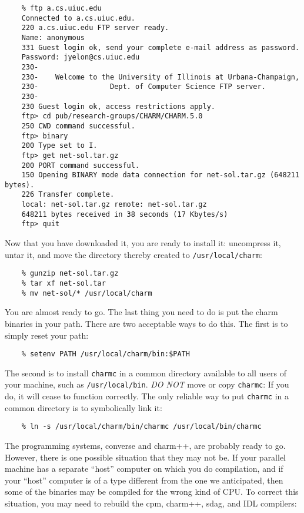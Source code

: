\begin{verbatim}
    % ftp a.cs.uiuc.edu
    Connected to a.cs.uiuc.edu.
    220 a.cs.uiuc.edu FTP server ready.
    Name: anonymous
    331 Guest login ok, send your complete e-mail address as password.
    Password: jyelon@cs.uiuc.edu
    230-
    230-    Welcome to the University of Illinois at Urbana-Champaign,
    230-                 Dept. of Computer Science FTP server.
    230-
    230 Guest login ok, access restrictions apply.
    ftp> cd pub/research-groups/CHARM/CHARM.5.0
    250 CWD command successful.
    ftp> binary
    200 Type set to I.
    ftp> get net-sol.tar.gz
    200 PORT command successful.
    150 Opening BINARY mode data connection for net-sol.tar.gz (648211 bytes).
    226 Transfer complete.
    local: net-sol.tar.gz remote: net-sol.tar.gz
    648211 bytes received in 38 seconds (17 Kbytes/s)
    ftp> quit
\end{verbatim}

Now that you have downloaded it, you are ready to install it: uncompress it,
untar it, and move the directory thereby created to {\tt /usr/local/charm}:

\begin{verbatim}
    % gunzip net-sol.tar.gz
    % tar xf net-sol.tar
    % mv net-sol/* /usr/local/charm
\end{verbatim}

You are almost ready to go.  The last thing you need to do is put the
charm binaries in your path.  There are two acceptable ways to do
this.  The first is to simply reset your path:

\begin{verbatim}
    % setenv PATH /usr/local/charm/bin:$PATH
\end{verbatim}

The second is to install {\tt charmc} in a common directory available
to all users of your machine, such as {\tt /usr/local/bin}.  {\em DO
NOT} move or copy {\tt charmc}: If you do, it will cease to function correctly.
The only reliable way to
put {\tt charmc} in a common directory is to symbolically link it:

\begin{verbatim}
    % ln -s /usr/local/charm/bin/charmc /usr/local/bin/charmc
\end{verbatim}

The programming systems, converse and charm++, are
probably ready to go.  However, there is one possible situation that
they may not be.  If your parallel machine has a separate ``host''
computer on which you do compilation, and if your ``host'' computer is
of a type different from the one we anticipated, then some of the
binaries may be compiled for the wrong kind of CPU.  To correct this
situation, you may need to rebuild the cpm, charm++, sdag, and IDL  compilers:

